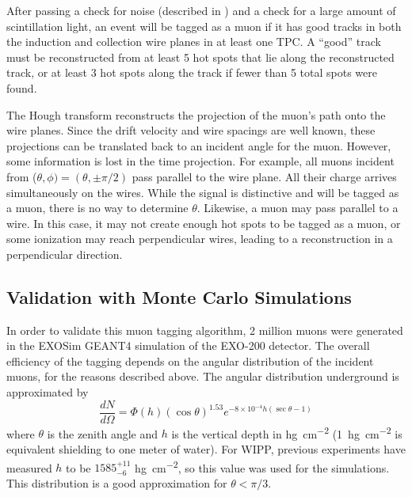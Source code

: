 \documentclass[herrin-thesis.tex]{subfiles}
\begin{document}
After passing a check for noise (described in ) and a check for a large amount of scintillation light, an event will be tagged as a muon if it has good tracks in both the induction and collection wire planes in at least one TPC. A ``good'' track must be reconstructed from at least 5 hot spots that lie along the reconstructed track, or at least 3 hot spots along the track if fewer than 5 total spots were found.

The Hough transform reconstructs the projection of the muon's path onto the wire planes. Since the drift velocity and wire spacings are well known, these projections can be translated back to an incident angle for the muon. However, some information is lost in the time projection. For example, all muons incident from (\(\theta,\phi) = (\theta, \pm\pi/2)\) pass parallel to the wire plane. All their charge arrives simultaneously on the wires. While the signal is distinctive and will be tagged as a muon, there is no way to determine \(\theta\). Likewise, a muon may pass parallel to a wire. In this case, it may not create enough hot spots to be tagged as a muon, or some ionization may reach perpendicular wires, leading to a reconstruction in a perpendicular direction.

\subsection{Validation with Monte Carlo Simulations}
In order to validate this muon tagging algorithm, 2 million muons were generated in the EXOSim GEANT4 simulation of the EXO-200 detector. The overall efficiency of the tagging depends on the angular distribution of the incident muons, for the reasons described above. The angular distribution underground is approximated\cite{miyake:1973} by
\begin{equation}
\label{eq:muon_angular_distribution}
\frac{dN}{d\Omega} = \Phi(h) \left (\cos \theta \right)^{1.53}e^{-8\times10^{-4} h \left(\sec \theta -1\right)}
\end{equation}
where \(\theta\) is the zenith angle and \(h\) is the vertical depth in \si{\hecto\g\per\square\cm} (\SI{1}{\hecto\g\per\square\cm} is equivalent shielding to one meter of water). For WIPP, previous experiments have measured \(h\) to be \(1585^{+11}_{-6}\) \si{\hecto\g\per\square\cm}\cite{Esch:2004zj}, so this value was used for the simulations. This distribution is a good approximation for \(\theta < \pi/3\).
\end{document}
